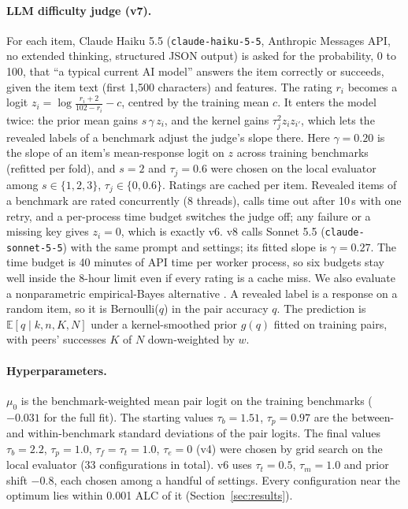 \documentclass{article}
\begin{document}
\paragraph{LLM difficulty judge (v7).} For each item, Claude Haiku 5.5 (\texttt{claude-haiku-5-5},
Anthropic Messages API, no extended thinking, structured JSON output) is asked for the probability,
0 to 100, that ``a typical current AI model'' answers the item correctly or succeeds, given the item
text (first 1,500 characters) and features. The rating $r_i$ becomes a logit
$z_i=\log\frac{r_i+2}{102-r_i}-c$, centred by the training mean $c$. It enters the model twice:
the prior mean gains $s\,\gamma\,z_i$, and the kernel gains $\tau_j^2 z_i z_{i'}$, which lets the
revealed labels of a benchmark adjust the judge's slope there. Here $\gamma=0.20$ is the slope of
an item's mean-response logit on $z$ across training benchmarks (refitted per fold), and $s=2$ and
$\tau_j=0.6$ were chosen on the local evaluator among $s\in\{1,2,3\}$, $\tau_j\in\{0,0.6\}$.
Ratings are cached per item. Revealed items of a benchmark are rated concurrently (8 threads), calls
time out after 10\,s with one retry, and a per-process time budget switches the judge off; any
failure or a missing key gives $z_i=0$, which is exactly v6. v8 calls Sonnet 5.5
(\texttt{claude-sonnet-5-5}) with the same prompt and settings; its fitted slope is $\gamma=0.27$.
The time budget is 40 minutes of API time per worker process, so six budgets stay well inside the
8-hour limit even if every rating is a cache miss.
We also evaluate a nonparametric empirical-Bayes alternative \citep{robbins1956}. A revealed label is
a response on a random item, so it is Bernoulli($q$) in the pair accuracy $q$. The prediction is
$\mathbb{E}[q\mid k,n,K,N]$ under a kernel-smoothed prior $g(q)$ fitted on training pairs, with
peers' successes $K$ of $N$ down-weighted by $w$.

\paragraph{Hyperparameters.} $\mu_0$ is the benchmark-weighted mean pair logit on the training
benchmarks ($-0.031$ for the full fit). The starting values $\tau_b = 1.51$, $\tau_p=0.97$ are the
between- and within-benchmark standard deviations of the pair logits. The final values
$\tau_b=2.2$, $\tau_p=1.0$, $\tau_f=\tau_t=1.0$, $\tau_e=0$ (v4) were chosen by grid search on the
local evaluator (33 configurations in total). v6 uses $\tau_t=0.5$, $\tau_m=1.0$ and prior shift
$-0.8$, each chosen among a handful of settings. Every configuration near the optimum lies within 0.001 ALC
of it (Section~\ref{sec:results}).
\end{document}
